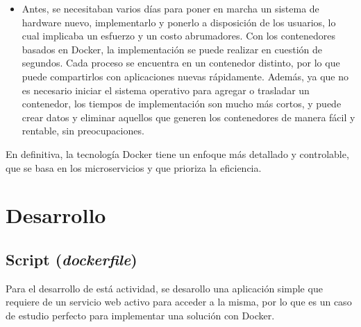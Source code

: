 \documentclass{dense_template}
\begin{document}
\begin{itemize}
\begin{itemize}
        \item Antes, se necesitaban varios días para poner en marcha un sistema de hardware nuevo, implementarlo y ponerlo a disposición de los usuarios, lo cual implicaba un esfuerzo y un costo abrumadores. Con los contenedores basados en Docker, la implementación se puede realizar en cuestión de segundos. Cada proceso se encuentra en un contenedor distinto, por lo que puede compartirlos con aplicaciones nuevas rápidamente. Además, ya que no es necesario iniciar el sistema operativo para agregar o trasladar un contenedor, los tiempos de implementación son mucho más cortos, y puede crear datos y eliminar aquellos que generen los contenedores de manera fácil y rentable, sin preocupaciones.
    \end{itemize}
\end{itemize}

En definitiva, la tecnología Docker tiene un enfoque más detallado y controlable, que se basa en los microservicios y que prioriza la eficiencia.

\section{Desarrollo}
\subsection{Script (\textit{dockerfile})}
Para el desarrollo de está actividad, se desarollo una aplicación simple que requiere de un servicio web activo para acceder a la misma, por lo que es un caso de estudio perfecto para implementar una solución con Docker.
\end{document}
